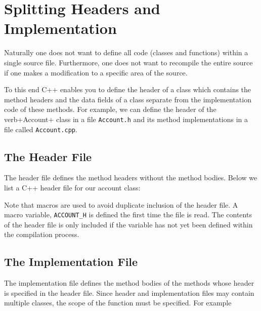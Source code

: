 \section{Splitting Headers and Implementation}

Naturally one does not want to define all code (classes and functions) within a
single source file. Furthermore, one does not want to recompile the entire
source if one makes a modification to a specific area of the source.

To this end C++ enables you to define the header of a class which contains the
method headers and the data fields of a class separate from the implementation
code of these methods. For example, we can define the header of the verb+Account+
class in a file \verb+Account.h+ and its method implementations in a file called
\verb+Account.cpp+.


\subsection{The Header File}

The header file defines the method headers without the method bodies. Below we
list a C++ header file for our account class:

\noindent{\small }

Note that macros are used to avoid duplicate inclusion of the header file. A macro
variable, \verb+ACCOUNT_H+ is defined the first time the file is read. The contents 
of the header file is only included if the variable has not yet been defined within
the compilation process. 


\subsection{The Implementation File}

The implementation file defines the method bodies of the methods whose header is 
specified in the header file. Since header and implementation files may contain 
multiple classes, the scope of the function must be specified. For example



